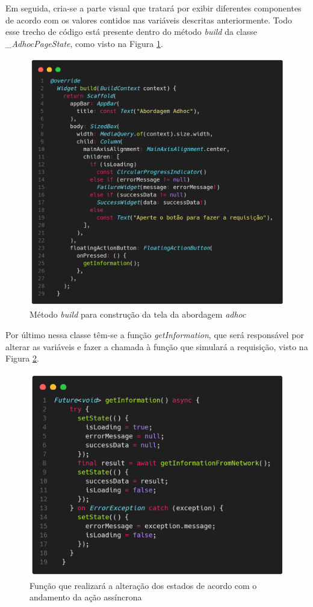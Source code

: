 \documentclass[12pt, %
openright, 
oneside, %
a4paper,    %
brazil]{facom-ufu-abntex2}
\begin{document}
Em seguida, cria-se a parte visual que tratará por exibir diferentes componentes de acordo com os valores contidos nas variáveis descritas anteriormente. Todo esse trecho de código está presente dentro do método \textit{build} da classe \textit{\_AdhocPageState}, como visto na Figura \ref{fig:adhoc_widget}.

\begin{figure}[ht]
    \centering
    \includegraphics[width=.65\textwidth, trim={0 30 0 100}, clip]{figures/states/adhoc_widget.png}
    \caption{Método \textit{build} para construção da tela da abordagem \textit{adhoc}}
    \label{fig:adhoc_widget}
\end{figure}

Por último nessa classe têm-se a função \textit{getInformation}, que será responsável por alterar as variáveis e fazer a chamada à função que simulará a requisição, visto na Figura \ref{fig:adhoc_getinfo}.

\begin{figure}[ht]
    \centering
    \includegraphics[width=.65\textwidth, trim={0 30 0 100}, clip]{figures/states/adhoc_getinfo.png}
    \caption{Função que realizará a alteração dos estados de acordo com o andamento da ação assíncrona}
    \label{fig:adhoc_getinfo}
\end{figure}
\end{document}
